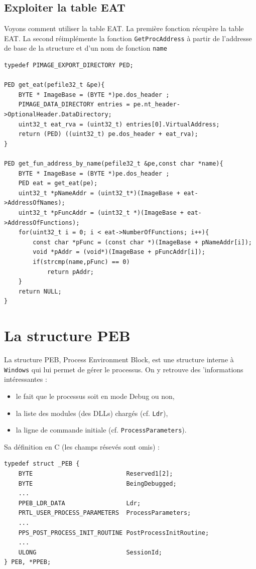 \documentclass{book}
\newcommand{\code}[1]{\texttt{#1}}
\begin{document}
\subsection{Exploiter la table EAT}

Voyons comment utiliser la table EAT. La première fonction récupère la table EAT. La second réimplémente la fonction \code{GetProcAddress} à partir de l'addresse de base de la structure et d'un nom de fonction \code{name}

\begin{verbatim}
typedef PIMAGE_EXPORT_DIRECTORY PED;

PED get_eat(pefile32_t &pe){
	BYTE * ImageBase = (BYTE *)pe.dos_header ;
	PIMAGE_DATA_DIRECTORY entries = pe.nt_header->OptionalHeader.DataDirectory;
	uint32_t eat_rva = (uint32_t) entries[0].VirtualAddress;
	return (PED) ((uint32_t) pe.dos_header + eat_rva);
}

PED get_fun_address_by_name(pefile32_t &pe,const char *name){
	BYTE * ImageBase = (BYTE *)pe.dos_header ;
	PED eat = get_eat(pe);
	uint32_t *pNameAddr = (uint32_t*)(ImageBase + eat->AddressOfNames);
	uint32_t *pFuncAddr = (uint32_t *)(ImageBase + eat->AddressOfFunctions);
	for(uint32_t i = 0; i < eat->NumberOfFunctions; i++){
		const char *pFunc = (const char *)(ImageBase + pNameAddr[i]);
		void *pAddr = (void*)(ImageBase + pFuncAddr[i]);
		if(strcmp(name,pFunc) == 0)
			return pAddr;
	}
	return NULL;
}
\end{verbatim}


\section{La structure PEB}

La structure PEB, Process Environment Block, est une structure interne à \code{Windows} qui lui permet de gérer le processus. On y retrouve des 'informations intéressantes : 
\begin{itemize}
	\item le fait que le processus soit en mode Debug ou non, 
	\item la liste des modules (des DLLs) chargés (cf. \code{Ldr}),
	\item la ligne de commande initiale (cf. \code{ProcessParameters}).
\end{itemize}

Sa définition en C (les champs résevés sont omis) : 
\begin{verbatim}
typedef struct _PEB {
	BYTE                          Reserved1[2];
	BYTE                          BeingDebugged;
	...
	PPEB_LDR_DATA                 Ldr;
	PRTL_USER_PROCESS_PARAMETERS  ProcessParameters;
	...
	PPS_POST_PROCESS_INIT_ROUTINE PostProcessInitRoutine;
	...
	ULONG                         SessionId;
} PEB, *PPEB;
\end{verbatim}
\end{document}
